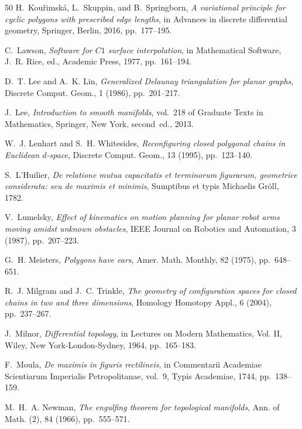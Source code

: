 \documentclass[11pt,letterpaper]{amsart}
\theoremstyle{plain}
\theoremstyle{definition}
\theoremstyle{remark}
\numberwithin{equation}{section}
\begin{document}
\begin{thebibliography}{50}
{\sc H.~Kou\v{r}imsk\'a, L.~Skuppin, and B.~Springborn}, {\em A variational
  principle for cyclic polygons with prescribed edge lengths}, in Advances in
  discrete differential geometry, Springer, Berlin, 2016, pp.~177--195.

{\sc C.~Lawson}, {\em Software for {$C1$} surface interpolation}, in
  Mathematical Software, J.~R. Rice, ed., Academic Press, 1977, pp.~161--194.

{\sc D.~T. Lee and A.~K. Lin}, {\em Generalized {D}elaunay triangulation for
  planar graphs}, Discrete Comput. Geom., 1 (1986), pp.~201--217.

{\sc J.~Lee}, {\em Introduction to smooth manifolds}, vol.~218 of Graduate
  Texts in Mathematics, Springer, New York, second~ed., 2013.

{\sc W.~J. Lenhart and S.~H. Whitesides}, {\em Reconfiguring closed polygonal
  chains in {E}uclidean {$d$}-space}, Discrete Comput. Geom., 13 (1995),
  pp.~123--140.

{\sc S.~L'Huilier}, {\em De relatione mutua capacitatis et terminorum
  figurarum, geometrice considerata: seu de maximis et minimis}, Sumptibus et
  typis Michaelis Gr{\"o}ll, 1782.

{\sc V.~Lumelsky}, {\em Effect of kinematics on motion planning for planar
  robot arms moving amidst unknown obstacles}, IEEE Journal on Robotics and
  Automation, 3 (1987), pp.~207--223.

{\sc G.~H. Meisters}, {\em Polygons have ears}, Amer. Math. Monthly, 82 (1975),
  pp.~648--651.

{\sc R.~J. Milgram and J.~C. Trinkle}, {\em The geometry of configuration
  spaces for closed chains in two and three dimensions}, Homology Homotopy
  Appl., 6 (2004), pp.~237--267.

{\sc J.~Milnor}, {\em Differential topology}, in Lectures on {M}odern
  {M}athematics, {V}ol. {II}, Wiley, New York-London-Sydney, 1964,
  pp.~165--183.

{\sc F.~Moula}, {\em De maximis in figuris rectilineis}, in Commentarii
  Academiae Scientiarum Imperialis Petropolitanae, vol.~9, Typis Academiae,
  1744, pp.~138--159.

{\sc M.~H.~A. Newman}, {\em The engulfing theorem for topological manifolds},
  Ann. of Math. (2), 84 (1966), pp.~555--571.


\end{thebibliography}
\end{document}

